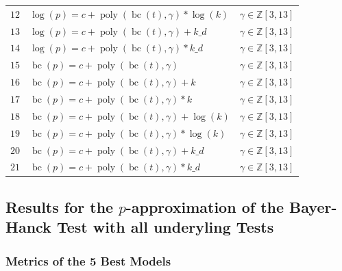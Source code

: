 \documentclass[12pt,a4paper]{article}
\DeclareMathOperator{\bc}{bc}
\DeclareMathOperator{\poly}{poly}
\begin{document}
\begin{table}
\begin{tabular}{rlc}
        $12$ & $\log(p) = c + \poly\left( \bc(t), \gamma \right) * \log(k) $ & $\gamma \in \mathbb{Z} \left[3, 13 \right]$\\
        $13$ & $\log(p) = c + \poly\left( \bc(t), \gamma \right) + k\_d $ & $\gamma \in \mathbb{Z} \left[3, 13 \right]$\\
        $14$ & $\log(p) = c + \poly\left( \bc(t), \gamma \right) * k\_d $ & $\gamma \in \mathbb{Z} \left[3, 13 \right]$\\   
        \midrule
        $15$ & $\bc(p) = c + \poly\left( \bc(t), \gamma \right) $ & $\gamma \in \mathbb{Z} \left[3, 13 \right]$\\ 
        $16$ & $\bc(p) = c + \poly\left( \bc(t), \gamma \right) + k $ & $\gamma \in \mathbb{Z} \left[3, 13 \right]$\\
        $17$ & $\bc(p) = c + \poly\left( \bc(t), \gamma \right) * k $ & $\gamma \in \mathbb{Z} \left[3, 13 \right]$\\
        $18$ & $\bc(p) = c + \poly\left( \bc(t), \gamma \right) + \log(k) $ & $\gamma \in \mathbb{Z} \left[3, 13 \right]$\\
        $19$ & $\bc(p) = c + \poly\left( \bc(t), \gamma \right) * \log(k) $ & $\gamma \in \mathbb{Z} \left[3, 13 \right]$\\
        $20$ & $\bc(p) = c + \poly\left( \bc(t), \gamma \right) + k\_d $ & $\gamma \in \mathbb{Z} \left[3, 13 \right]$\\
        $21$ & $\bc(p) = c + \poly\left( \bc(t), \gamma \right) * k\_d $ & $\gamma \in \mathbb{Z} \left[3, 13 \right]$\\    
        \bottomrule
    \end{tabular}
\end{table}
\FloatBarrier

\hypertarget{results-for-the-p-approximation-of-the-bayer-hanck-test-with-all-underyling-tests}{%
\subsection{\texorpdfstring{Results for the \(p\)-approximation of the
Bayer-Hanck Test with all underyling
Tests}{Results for the p-approximation of the Bayer-Hanck Test with all underyling Tests}}\label{results-for-the-p-approximation-of-the-bayer-hanck-test-with-all-underyling-tests}}

\hypertarget{metrics-of-the-5-best-models}{%
\subsubsection{Metrics of the 5 Best
Models}\label{metrics-of-the-5-best-models}}
\end{document}
